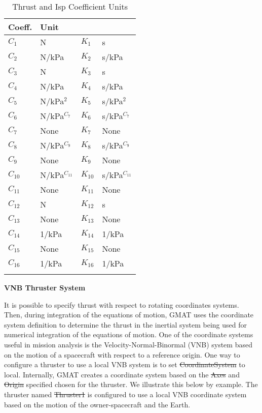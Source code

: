 \begin{table}[h!]
\centering \caption{ Thrust and Isp Coefficient Units }
      \begin{tabular}{llll}
      \hline\hline
         Coeff. & Unit \\
         \hline
         $C_1$ & N & $K_1$ & s \\
         $C_2$ & N/kPa & $K_2$ & s/kPa\\
         $C_3$ & N  & $K_3$ & s  \\
         $C_4$ & N/kPa & $K_4$ & s/kPa \\
         $C_5$ & N/kPa$^2$ & $K_5$ & s/kPa$^2$ \\
         $C_6$ & N/kPa$^{C_7}$ & $K_6$ & s/kPa$^{C_7}$ \\
         $C_7$ & None & $K_7$ & None  \\
         $C_8$ & N/kPa$^{C_9}$ & $K_8$ & s/kPa$^{C_9}$ \\
         $C_9$ & None & $K_9$ & None \\
         $C_{10}$ & N/kPa$^{C_{11}}$  & $K_{10}$ & s/kPa$^{C_{11}}$  \\
         $C_{11}$ & None & $K_{11}$ & None \\
         $C_{12}$ & N & $K_{12}$ & s\\
         $C_{13}$ & None & $K_{13}$ & None \\
         $C_{14}$ & 1/kPa  & $K_{14}$ & 1/kPa  \\
         $C_{15}$ & None & $K_{15}$ & None \\
         $C_{16}$ & 1/kPa & $K_{16}$ & 1/kPa  \\
      \hline\hline
      \label{Table:OE_RigorouslyJ2Inv}
\end{tabular} \normalsize
\end{table}

\textbf{VNB Thruster System}

It is possible to specify thrust with respect to rotating
coordinates systems.  Then, during integration of the equations of
motion, GMAT uses the coordinate system definition to determine the
thrust in the inertial system being used for numerical integration
of the equations of motion.    One of the coordinate systems useful
in mission analysis is the Velocity-Normal-Binormal (VNB) system
based on the motion of a spacecraft with respect to a reference
origin. One way to configure a thruster to use a local VNB system is
to set \st{CoordinateSystem} to local.  Internally, GMAT creates a
coordinate system based on the \st{Axes} and \st{Origin} specified
chosen for the thruster. We illustrate this below by example. The
thruster named \st{Thruster1} is configured to use a local VNB
coordinate system based on the motion of the owner-spacecraft and
the Earth.

